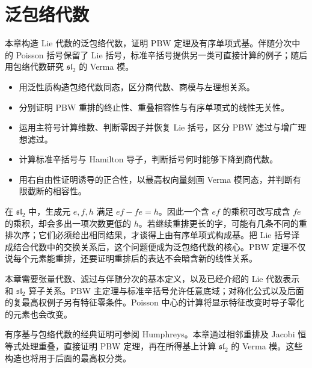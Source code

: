 \chapter{泛包络代数}
\label{b5:ch:15}

\begin{chapterabstract}
	本章构造 Lie 代数的泛包络代数，证明 PBW 定理及有序单项式基。伴随分次中的 Poisson 括号保留了 Lie 括号，标准辛括号提供另一类可直接计算的例子；随后用包络代数研究 \(\mathfrak{sl}_2\) 的 Verma 模。
\end{chapterabstract}

\begin{learninggoals}
	\begin{itemize}
		\item 用泛性质构造包络代数同态，区分商代数、商模与左理想关系。
		\item 分别证明 PBW 重排的终止性、重叠相容性与有序单项式的线性无关性。
		\item 运用主符号计算维数、判断零因子并恢复 Lie 括号，区分 PBW 滤过与增广理想滤过。
		\item 计算标准辛括号与 Hamilton 导子，判断括号何时能够下降到商代数。
		\item 用右自由性证明诱导的正合性，以最高权向量刻画 Verma 模同态，并判断有限截断的相容性。
	\end{itemize}
\end{learninggoals}

在 \(\mathfrak{sl}_2\) 中，生成元 \(e,f,h\) 满足 \(ef-fe=h\)。因此一个含 \(ef\) 的乘积可改写成含 \(fe\) 的乘积，却会多出一项次数更低的 \(h\)。若继续重排更长的字，可能有几条不同的重排次序；它们必须给出相同结果，才谈得上由有序单项式构成基。把 Lie 括号译成结合代数中的交换关系后，这个问题便成为泛包络代数的核心。PBW 定理不仅说每个元素能重排，还要证明重排后的表达不会暗含新的线性关系。

\ProseParagraphBreak
本章需要张量代数、滤过与伴随分次的基本定义，以及已经介绍的 Lie 代数表示和 \(\mathfrak{sl}_2\) 算子关系。PBW 主定理与标准辛括号允许任意底域；对称化公式以及后面的复最高权例子另有特征零条件。Poisson 中心的计算将显示特征改变时导子零化的元素也会改变。

\ProseParagraphBreak
有序基与包络代数的经典证明可参阅 Humphreys\cite[Sections 17.3--17.4, pp. 91--94]{Humphreys1972LieAlgebras}。本章通过相邻重排及 Jacobi 恒等式处理重叠，直接证明 PBW 定理，再在所得基上计算 \(\mathfrak{sl}_2\) 的 Verma 模。这些构造也将用于后面的最高权分类。

